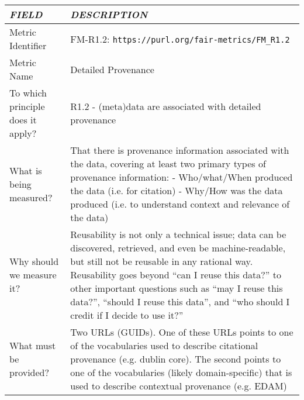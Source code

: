 \documentclass[english]{article}
\begin{document}
\begin{longtable}{|p{5cm}|p{9cm}|}


\hline
\emph{FIELD} & \emph{DESCRIPTION} \\
\hline
Metric Identifier &   FM-R1.2: \verb"https://purl.org/fair-metrics/FM_R1.2"
\\


\hline
Metric Name &   


Detailed Provenance


 \\



\hline
To which principle does it apply? &   


R1.2 - (meta)data are associated with detailed provenance

\\



\hline
What is being measured? & 


That there is provenance information associated with the data, covering at least two primary types of provenance information:\newline 
\newline 
- Who/what/When produced the data (i.e. for citation)\newline 
- Why/How was the data produced (i.e. to understand context and relevance of the data)

\\



\hline
Why should we measure it? & 


Reusability is not only a technical issue; data can be discovered, retrieved, and even be machine-readable, but still not be reusable in any rational way.  Reusability goes beyond “can I reuse this data?” to other important questions such as “may I reuse this data?”, “should I reuse this data”, and “who should I credit if I decide to use it?”


  
\\



\hline
What must be provided? &  


Two URLs (GUIDs).  One of these URLs points to one of the vocabularies used to describe citational provenance (e.g. dublin core).  The second points to one of the vocabularies (likely domain-specific) that is used to describe contextual provenance (e.g. EDAM)



\end{longtable}
\end{document}
